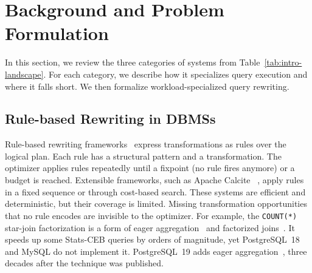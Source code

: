 \section{Background and Problem Formulation}
\label{sec:background}
In this section, we review the three categories of systems from Table~\ref{tab:intro-landscape}.
For each category, we describe how it specializes query execution and where it falls short.
We then formalize workload-specialized query rewriting.

\subsection{Rule-based Rewriting in DBMSs}
\label{sec:bg_rules}
Rule-based rewriting frameworks~\cite{PiraheshHH92} express transformations as rules over the logical plan.
Each rule has a structural pattern and a transformation.
The optimizer applies rules repeatedly until a fixpoint (no rule fires anymore) or a budget is reached.
Extensible frameworks, such as Apache Calcite~\cite{Calcite} , apply rules in a fixed sequence or through cost-based search.
These systems are efficient and deterministic, but their coverage is limited.
Missing transformation opportunities that no rule encodes are invisible to the optimizer.
For example, the \texttt{COUNT(*)} star-join factorization is a form of eager aggregation~\cite{YanL95,ChaudhuriS94} and factorized joins~\cite{BakibayevKOZ13}.
It speeds up some Stats-CEB queries by orders of magnitude, yet PostgreSQL~18 and MySQL do not implement it.
PostgreSQL~19 adds eager aggregation~\cite{PG19}, three decades after the technique was published.

